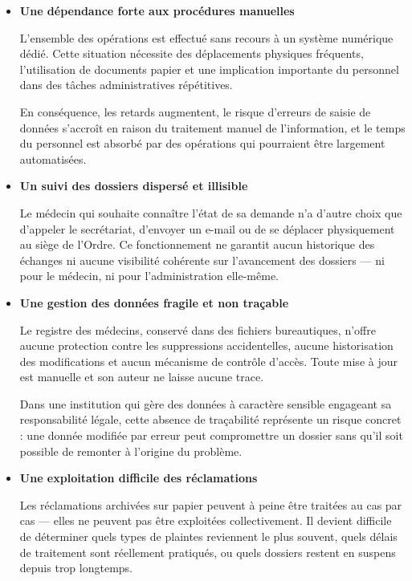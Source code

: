 ﻿\documentclass[12pt,a4paper]{report}
\begin{document}
\begin{itemize}

\item \textbf{Une dépendance forte aux procédures manuelles}

L'ensemble des opérations est effectué sans recours à un système numérique dédié. Cette situation nécessite des déplacements physiques fréquents, l'utilisation de documents papier et une implication importante du personnel dans des tâches administratives répétitives.

En conséquence, les retards augmentent, le risque d'erreurs de saisie de données s'accroît en raison du traitement manuel de l'information, et le temps du personnel est absorbé par des opérations qui pourraient être largement automatisées.

\item \textbf{Un suivi des dossiers dispersé et illisible}

Le médecin qui souhaite connaître l'état de sa demande n'a
d'autre choix que d'appeler le secrétariat, d'envoyer un
e-mail ou de se déplacer physiquement au siège de l'Ordre.
Ce fonctionnement ne garantit aucun historique des échanges
ni aucune visibilité cohérente sur l'avancement des dossiers —
ni pour le médecin, ni pour l'administration elle-même.

\item \textbf{Une gestion des données fragile et non traçable}

Le registre des médecins, conservé dans des fichiers bureautiques,
n'offre aucune protection contre les suppressions accidentelles,
aucune historisation des modifications et aucun mécanisme
de contrôle d'accès. Toute mise à jour est manuelle et
son auteur ne laisse aucune trace.

Dans une institution qui gère des données à caractère sensible
engageant sa responsabilité légale, cette absence de traçabilité
représente un risque concret : une donnée modifiée par erreur
peut compromettre un dossier sans qu'il soit possible de
remonter à l'origine du problème.

\item \textbf{Une exploitation difficile des réclamations}

Les réclamations archivées sur papier peuvent à peine être
traitées au cas par cas — elles ne peuvent pas être exploitées
collectivement. Il devient difficile de déterminer quels types
de plaintes reviennent le plus souvent, quels délais de
traitement sont réellement pratiqués, ou quels dossiers
restent en suspens depuis trop longtemps.





\end{itemize}
\end{document}
